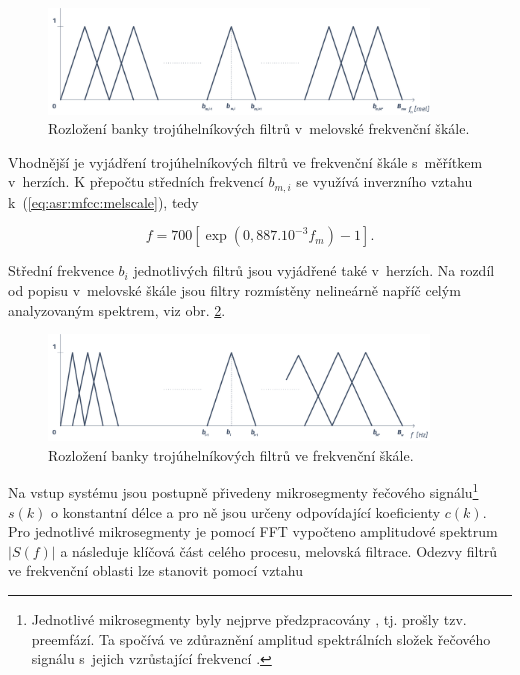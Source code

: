 \begin{figure}[hbpt]
  \centering
  \includegraphics[width=0.9\textwidth]{./ch4-asr/img/filter_bank-mel.pdf}
  \caption{Rozložení banky trojúhelníkových filtrů v~melovské frekvenční škále.}
  \label{fig:asr:mfcc:bank:mel}
\end{figure}

\noindent Vhodnější je vyjádření trojúhelníkových filtrů ve frekvenční škále s~měřítkem v~herzích. K přepočtu středních frekvencí $b_{m,i}$ se využívá inverzního vztahu  k~(\ref{eq:asr:mfcc:melscale}), tedy

\begin{equation}
  f = 700 \left[ \exp\left( 0,887.10^{-3} f_m \right) - 1 \right].
  \label{eq:asr:mfcc:melscale:inverse}
\end{equation}

\noindent Střední frekvence $b_i$ jednotlivých filtrů jsou vyjádřené také v~herzích. Na rozdíl od popisu v~melovské škále jsou filtry rozmístěny nelineárně napříč celým analyzovaným spektrem, viz obr. \ref{fig:asr:mfcc:bank:hz}.

\begin{figure}[hbpt]
  \centering
  \includegraphics[width=0.9\textwidth]{./ch4-asr/img/filter_bank-hz.pdf}
  \caption{Rozložení banky trojúhelníkových filtrů ve frekvenční škále.}
  \label{fig:asr:mfcc:bank:hz}
\end{figure}

Na vstup systému jsou postupně přivedeny mikrosegmenty řečového signálu\footnote{Jednotlivé mikrosegmenty byly nejprve předzpracovány , tj. prošly tzv. preemfází. Ta spočívá ve zdůraznění amplitud spektrálních složek řečového signálu s~jejich vzrůstající frekvencí \cite{Psutka2006}.} $s\left(k\right)$ o konstantní délce a pro ně jsou určeny odpovídající koeficienty $c\left(k\right)$. Pro jednotlivé mikrosegmenty je pomocí FFT vypočteno amplitudové spektrum $\left| S(f) \right|$ a následuje klíčová část celého procesu, melovská filtrace. Odezvy filtrů ve frekvenční oblasti lze stanovit pomocí vztahu

